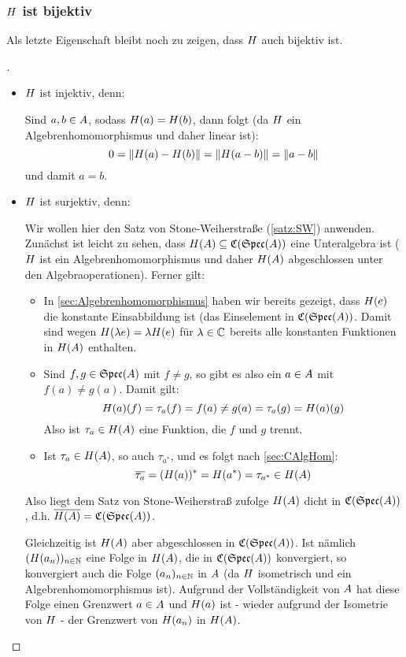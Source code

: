 \subsubsection{$H$ ist bijektiv}\label{sec:Bijektiv}

Als letzte Eigenschaft bleibt noch zu zeigen, dass $H$ auch bijektiv ist.

\begin{proof}[]\ 

\begin{itemize}
\item $H$ ist injektiv, denn:

Sind $a, b \in A$, sodass $H(a) = H(b)$, dann folgt (da $H$ ein Algebrenhomomorphismus und daher linear ist):
	\[0 = \left\lVert H(a) - H(b)\right\rVert = \left\lVert H(a-b)\right\rVert = \left\lVert a-b\right\rVert\]
und damit $a = b$.

\item $H$ ist surjektiv, denn:

Wir wollen hier den Satz von Stone-Weiherstraße (\ref{satz:SW}) anwenden. Zunächst ist leicht zu sehen, dass $H(A) \subseteq \mathfrak{C}(\mathfrak{Spec}(A))$ eine Unteralgebra ist ($H$ ist ein Algebrenhomomorphismus und daher $H(A)$ abgeschlossen unter den Algebraoperationen). Ferner gilt:
\begin{itemize}
	\item In \cref{sec:Algebrenhomomorphismus} haben wir bereits gezeigt, dass $H(e)$ die konstante Einsabbildung ist (das Einselement in $\mathfrak{C}(\mathfrak{Spec}(A))$. Damit sind wegen $H(\lambda e) = \lambda H(e)$ für $\lambda \in \mathbb{C}$ bereits alle konstanten Funktionen in $H(A)$ enthalten.
	\item Sind $f, g \in \mathfrak{Spec}(A)$ mit $f \neq g$, so gibt es also ein $a \in A$ mit $f(a) \neq g(a)$. Damit gilt:
		\[H(a)(f) = \tau_a(f) = f(a) \neq g(a) = \tau_a(g) = H(a)(g)\]
		Also ist $\tau_a \in H(A)$ eine Funktion, die $f$ und $g$ trennt.
	\item Ist $\tau_a \in H(A)$, so auch $\tau_{a^*}$, und es folgt nach \cref{sec:CAlgHom}:
		\[\overline{\tau_a} = (H(a))^* = H(a^*) = \tau_{a^*} \in H(A)\]
\end{itemize}
Also liegt dem Satz von Stone-Weiherstraß zufolge $H(A)$ dicht in $\mathfrak{C}(\mathfrak{Spec}(A))$, d.h. $\overline{H(A)} = \mathfrak{C}(\mathfrak{Spec}(A))$.

Gleichzeitig ist $H(A)$ aber abgeschlossen in $\mathfrak{C}(\mathfrak{Spec}(A))$. Ist nämlich $(H(a_n))_{n\in\mathbb{N}}$ eine Folge in $H(A)$, die in $\mathfrak{C}(\mathfrak{Spec}(A))$ konvergiert, so konvergiert auch die Folge $(a_n)_{n\in\mathbb{N}}$ in $A$ (da $H$ isometrisch und ein Algebrenhomomorphismus ist). Aufgrund der Vollständigkeit von $A$ hat diese Folge einen Grenzwert $a \in A$ und $H(a)$ ist - wieder aufgrund der Isometrie von $H$ - der Grenzwert von $H(a_n)$ in $H(A)$. 


\end{itemize}
\end{proof}
